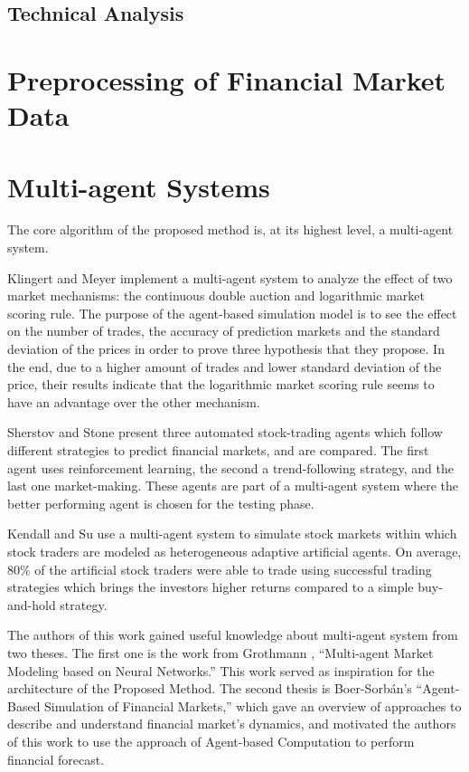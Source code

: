 \subsection{Technical Analysis}
\label{subsection:technical-analysis}

\section{Preprocessing of Financial Market Data}
\label{section:preprocessing-of-financial-market-data}

\section{Multi-agent Systems}
\label{section:multi-agent-systems}

The core algorithm of the proposed method is, at its highest level, a
multi-agent system.

Klingert and Meyer \cite{Klingert_2012} implement a multi-agent system to
analyze the effect of two market mechanisms: the continuous double auction and
logarithmic market scoring rule. The purpose of the agent-based simulation model
is to see the effect on the number of trades, the accuracy of prediction markets
and the standard deviation of the prices in order to prove three hypothesis that
they propose. In the end, due to a higher amount of trades and lower standard
deviation of the price, their results indicate that the logarithmic market
scoring rule seems to have an advantage over the other mechanism.

Sherstov and Stone \cite{Sherstov2005} present three automated stock-trading
agents which follow different strategies to predict financial markets, and are
compared. The first agent uses reinforcement learning, the second a
trend-following strategy, and the last one market-making. These agents are part
of a multi-agent system where the better performing agent is chosen for the
testing phase.

Kendall and Su \cite{Kendall2003} use a multi-agent system to simulate stock
markets within which stock traders are modeled as heterogeneous adaptive
artificial agents. On average, 80\% of the artificial stock traders were able to
trade using successful trading strategies which brings the investors higher
returns compared to a simple buy-and-hold strategy.


The authors of this work gained useful knowledge about multi-agent system from
two theses. The first one is the work from Grothmann \cite{Grothmann2002},
``Multi-agent Market Modeling based on Neural Networks.'' This work served as
inspiration for the architecture of the Proposed Method. The second thesis is
Boer-Sorb{\'{a}}n's ``Agent-Based Simulation of Financial Markets,'' which gave
an overview of approaches to describe and understand financial market's
dynamics, and motivated the authors of this work to use the approach of
Agent-based Computation to perform financial forecast.

